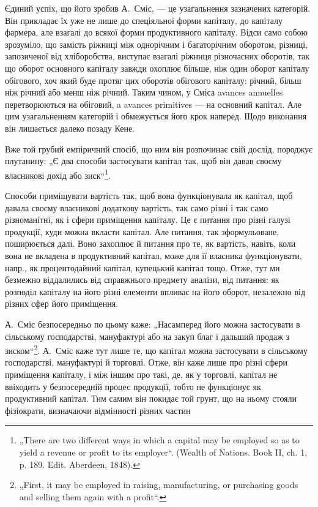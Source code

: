 Єдиний успіх, що його зробив А.~Сміс, — це узагальнення зазначених
категорій. Він прикладає їх уже не лише до спеціяльної форми капіталу,
до капіталу фармера, але взагалі до всякої форми продуктивного капіталу.
Відси само собою зрозуміло, що замість ріжниці між однорічним і багаторічним
оборотом, різниці, запозиченої від хліборобства, виступає взагалі
ріжниця різночасних оборотів, так що оборот основного капіталу завжди
охоплює більше, ніж один оборот капіталу обігового, хоч який буде
протяг цих оборотів обігового капіталу: річний, більш ніж річний або
менш ніж річний. Таким чином, у Сміса avances annuelles перетворюються
на обіговий, a avances primitives — на основний капітал. Але цим узагальненням
категорій і обмежується його крок наперед. Щодо виконання він
лишається далеко позаду Кене.

Вже той грубий емпіричний спосіб, що ним він розпочинає свій дослід,
породжує плутанину: „Є два способи застосувати капітал так, щоб
він давав своєму власникові дохід або зиск“\footnote*{
„There are two different ways in which a capital may be employed so as to
yield a revenue or profit to its employer“. (Wealth of Nations. Book II, ch. 1, p. 189.
Edit. Aberdeen, 1848).
}.

Способи приміщувати вартість так, щоб вона функціонувала як капітал,
щоб давала своєму власникові додаткову вартість, так само різні
і так само різноманітні, як і сфери приміщення капіталу. Це є питання
про різні галузі продукції, куди можна вкласти капітал. Але питання, так
зформульоване, поширюється далі. Воно захоплює й питання про те, як
вартість, навіть, коли вона не вкладена в продуктивний капітал, може для
її власника функціонувати, напр., як процентодайний капітал, купецький
капітал тощо. Отже, тут ми безмежно віддалились від справжнього предмету
аналізи, від питання: як розподіл  капіталу на
його різні елементи впливає на його оборот, незалежно від різних сфер
його приміщення.

А.~Сміс безпосередньо по цьому каже: „Насамперед його можна застосувати
в сільському господарстві, мануфактурі або на закуп благ і дальший
продаж з зиском“\footnote*{
„First, it may be employed in raising, manufacturing, or purchasing goods and
selling them again with a profit“.
}. А.~Сміс каже тут лише те, що капітал можна
застосувати в сільському господарстві, мануфактурі й торговлі. Отже, він
каже лише про різні сфери приміщення капіталу, і між іншим про такі, де,
як у торговлі, капітал не ввіходить у безпосередній процес продукції, тобто
не функціонує як продуктивний капітал. Тим самим він покидає той грунт,
що на ньому стояли фізіократи, визначаючи відмінності різних частин
\parbreak{}  %
